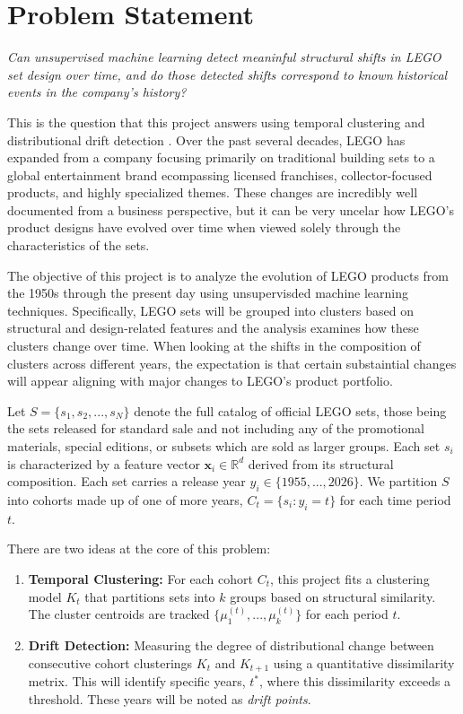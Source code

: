 \documentclass[11pt, letterpaper]{article}
\begin{document}
\section{Problem Statement}
\label{sec:problem_statement}

\textit{Can unsupervised machine learning detect meaninful structural shifts in LEGO set design over time, and do those detected shifts correspond to known historical events in the company's history?}

This is the question that this project answers using temporal clustering \cite{chi2007evolutionary} and distributional drift detection \cite{gama2014survey}. Over the past several decades, LEGO has expanded from a company focusing primarily on traditional building sets to a global entertainment brand ecompassing licensed franchises, collector-focused products, and highly specialized themes. These changes are incredibly well documented from a business perspective, but it can be very uncelar how LEGO's product designs have evolved over time when viewed solely through the characteristics of the sets. 

The objective of this project is to analyze the evolution of LEGO products from the 1950s through the present day using unsupervisded machine learning techniques. Specifically, LEGO sets will be grouped into clusters based on structural and design-related features and the analysis examines how these clusters change over time. When looking at the shifts in the composition of clusters across different years, the expectation is that certain substaintial changes will appear aligning with major changes to LEGO's product portfolio. 

Let $S = \{ s_1, s_2, ..., s_N\}$ denote the full catalog of official LEGO sets, those being the sets released for standard sale and not including any of the promotional materials, special editions, or subsets which are sold as larger groups. Each set $s_i$ is characterized by a feature vector $\mathbf{x}_i \in \mathbb{R}^d$ derived from its structural composition. Each set carries a release year $y_i \in \{1955, ..., 2026\}$. We partition $S$ into cohorts made up of one of more years, $C_t = \{s_i:y_i = t\}$ for each time period $t$.

There are two ideas at the core of this problem:

\begin{enumerate}
    \item \textbf{Temporal Clustering:} For each cohort $C_t$, this project fits a clustering model $K_t$ that partitions sets into $k$ groups based on structural similarity. The cluster centroids are tracked $\{\mu_1^{(t)},...,\mu_k^{(t)}\}$ for each period $t$.
    \item \textbf{Drift Detection:} Measuring the degree of distributional change between consecutive cohort clusterings $K_t$ and $K_{t+1}$ using a quantitative dissimilarity metrix. This will identify specific years, $t^*$, where this dissimilarity exceeds a threshold. These years will be noted as \textit{drift points}.
\end{enumerate}
\end{document}
